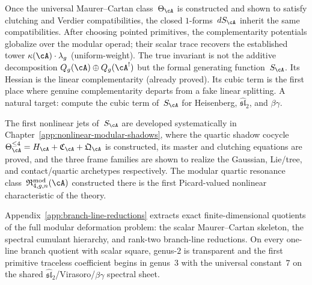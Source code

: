 \begin{remark}
\label{rem:complementarity-potential-modular}
Once the universal Maurer--Cartan class~$\Theta_\cA$ is
constructed and shown to satisfy clutching and Verdier
compatibilities, the closed $1$-forms~$dS_\cA$ inherit
the same compatibilities. After choosing pointed
primitives, the complementarity potentials globalize over
the modular operad; their scalar trace recovers the
established tower
$\kappa(\cA) \cdot \lambda_g$ (uniform-weight). The true invariant is not
the additive decomposition
$Q_g(\cA) \oplus Q_g(\cA^!)$ but the formal generating
function~$S_\cA$. Its Hessian is the linear
complementarity (already proved). Its cubic term is the
first place where genuine complementarity departs from a
fake linear splitting. A natural target: compute the
cubic term of~$S_\cA$ for Heisenberg,
$\widehat{\mathfrak{sl}}_2$, and $\beta\gamma$.
\end{remark}

\begin{remark}
\label{rem:nonlinear-shadow-pointer}
The first nonlinear jets of~$S_\cA$ are developed systematically
in Chapter~\ref{app:nonlinear-modular-shadows}, where the quartic
shadow cocycle
$\Theta_\cA^{\le 4} = H_\cA + \mathfrak C_\cA + \mathfrak Q_\cA$
is constructed, its master and clutching equations are proved,
and the three frame families are shown to realize the Gaussian,
Lie/tree, and contact/quartic archetypes respectively.
The modular quartic resonance class~$\mathfrak R_{4,g,n}^{\mathrm{mod}}(\cA)$
constructed there is the first Picard-valued nonlinear characteristic of the theory.
\end{remark}

\begin{remark}
\label{rem:branch-line-pointer}
Appendix~\ref{app:branch-line-reductions} extracts exact
finite-dimensional quotients of the full modular deformation problem: the
scalar Maurer--Cartan skeleton, the spectral cumulant hierarchy, and
rank-two branch-line reductions. On every one-line branch quotient
with scalar square, genus-$2$ is transparent and the first primitive
traceless coefficient begins in genus~$3$ with the universal
constant~$7$ on the shared
$\widehat{\mathfrak{sl}}_2$/Virasoro/$\beta\gamma$ spectral sheet.
\end{remark}

